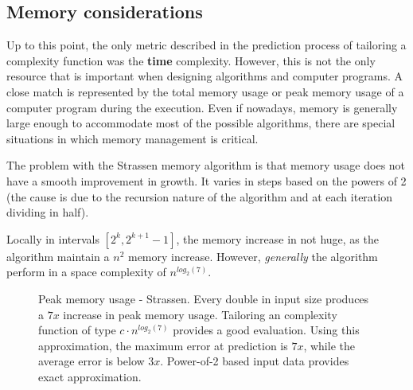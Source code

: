 \subsection{Memory considerations}

Up to this point, the only metric described in the prediction process of tailoring a complexity function was the \textbf{time} complexity. However, this is not the only resource that is important when designing algorithms and computer programs. A close match is represented by the total memory usage or peak memory usage of a computer program during the execution. Even if nowadays, memory is generally large enough to accommodate most of the possible algorithms, there are special situations in which memory management is critical.

The problem with the Strassen memory algorithm is that memory usage does not have a smooth improvement in growth. It varies in steps based on the powers of 2 (the cause is due to the recursion nature of the algorithm and at each iteration dividing in half).

Locally in intervals $[2^k, 2^{k+1} - 1]$, the memory increase in not huge, as the algorithm maintain a $n^2$ memory increase. However, \textit{generally} the algorithm perform in a space complexity of $n^{log_{2}(7)}$.

\begin{figure}[H]
\caption{Peak memory usage - Strassen. Every double in input size produces a $7x$ increase in peak memory usage. Tailoring an complexity function of type $c \cdot n^{log_2(7)}$ provides a good evaluation. Using this approximation, the maximum error at prediction is $7x$, while the average error is below $3x$. Power-of-2 based input data provides exact approximation.}
\end{figure}

